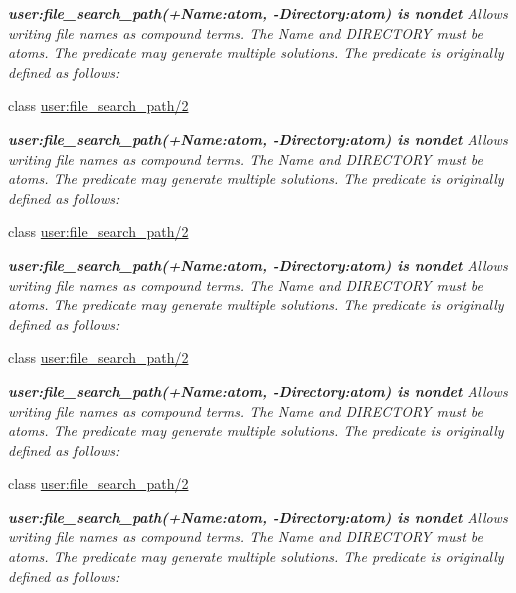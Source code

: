 \begin{DoxyCompactItemize}
\begin{DoxyCompactList}\small\item\em {\bfseries  user\+:file\+\_\+search\+\_\+path(+\+Name\+:atom, -\/\+Directory\+:atom) is nondet } Allows writing file names as compound terms. The {\itshape Name} and {\itshape D\+I\+R\+E\+C\+T\+O\+RY} must be atoms. The predicate may generate multiple solutions. The predicate is originally defined as follows\+: \end{DoxyCompactList}\item 
class \hyperlink{classuser_1_1file__search__path_22}{user\+:file\+\_\+search\+\_\+path/2}
\begin{DoxyCompactList}\small\item\em {\bfseries  user\+:file\+\_\+search\+\_\+path(+\+Name\+:atom, -\/\+Directory\+:atom) is nondet } Allows writing file names as compound terms. The {\itshape Name} and {\itshape D\+I\+R\+E\+C\+T\+O\+RY} must be atoms. The predicate may generate multiple solutions. The predicate is originally defined as follows\+: \end{DoxyCompactList}\item 
class \hyperlink{classuser_1_1file__search__path_22}{user\+:file\+\_\+search\+\_\+path/2}
\begin{DoxyCompactList}\small\item\em {\bfseries  user\+:file\+\_\+search\+\_\+path(+\+Name\+:atom, -\/\+Directory\+:atom) is nondet } Allows writing file names as compound terms. The {\itshape Name} and {\itshape D\+I\+R\+E\+C\+T\+O\+RY} must be atoms. The predicate may generate multiple solutions. The predicate is originally defined as follows\+: \end{DoxyCompactList}\item 
class \hyperlink{classuser_1_1file__search__path_22}{user\+:file\+\_\+search\+\_\+path/2}
\begin{DoxyCompactList}\small\item\em {\bfseries  user\+:file\+\_\+search\+\_\+path(+\+Name\+:atom, -\/\+Directory\+:atom) is nondet } Allows writing file names as compound terms. The {\itshape Name} and {\itshape D\+I\+R\+E\+C\+T\+O\+RY} must be atoms. The predicate may generate multiple solutions. The predicate is originally defined as follows\+: \end{DoxyCompactList}\item 
class \hyperlink{classuser_1_1file__search__path_22}{user\+:file\+\_\+search\+\_\+path/2}
\begin{DoxyCompactList}\small\item\em {\bfseries  user\+:file\+\_\+search\+\_\+path(+\+Name\+:atom, -\/\+Directory\+:atom) is nondet } Allows writing file names as compound terms. The {\itshape Name} and {\itshape D\+I\+R\+E\+C\+T\+O\+RY} must be atoms. The predicate may generate multiple solutions. The predicate is originally defined as follows\+: \end{DoxyCompactList}\item 

\end{DoxyCompactItemize}
